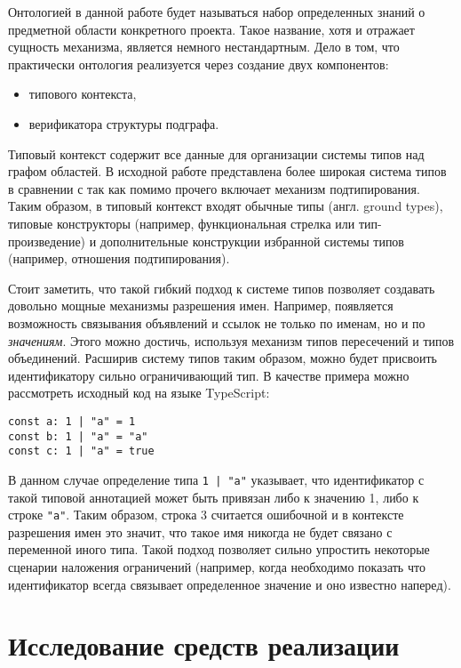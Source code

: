 Онтологией в данной работе будет называться набор определенных знаний о предметной области конкретного проекта.
Такое название, хотя и отражает сущность механизма, является немного нестандартным. Дело в том, что
практически онтология реализуется через создание двух компонентов:
\begin{itemize}
    \item типового контекста,
    \item верификатора структуры подграфа.
\end{itemize}

Типовый контекст содержит все данные для организации системы типов над графом областей. В исходной работе \cite{scope-graphs-typed}
представлена более широкая система типов в сравнении с \cite{scope-graphs-static-analysis} так как помимо прочего включает
механизм подтипирования. Таким образом, в типовый контекст входят обычные типы (англ. ground types), типовые конструкторы
(например, функциональная стрелка или тип-произведение) и дополнительные конструкции избранной системы типов (например, отношения подтипирования).

Стоит заметить, что такой гибкий подход к системе типов позволяет создавать довольно мощные механизмы разрешения имен. Например,
появляется возможность связывания объявлений и ссылок не только по именам, но и по \textit{значениям}. Этого можно достичь, используя
механизм типов пересечений и типов объединений. %
Расширив систему типов таким образом, можно будет присвоить идентификатору сильно ограничивающий тип. В качестве примера можно рассмотреть
исходный код на языке TypeScript:
\begin{verbatim}
const a: 1 | "a" = 1
const b: 1 | "a" = "a"
const c: 1 | "a" = true
\end{verbatim}

В данном случае определение типа \texttt{1 | "a"} указывает, что идентификатор с такой типовой аннотацией может быть
привязан либо к значению 1, либо к строке \texttt{"a"}. Таким образом, строка 3 считается ошибочной и в контексте
разрешения имен это значит, что такое имя никогда не будет связано с переменной иного типа. Такой подход позволяет
сильно упростить некоторые сценарии наложения ограничений (например, когда необходимо показать что идентификатор всегда связывает
определенное значение и оно известно наперед).


\section{Исследование средств реализации}

